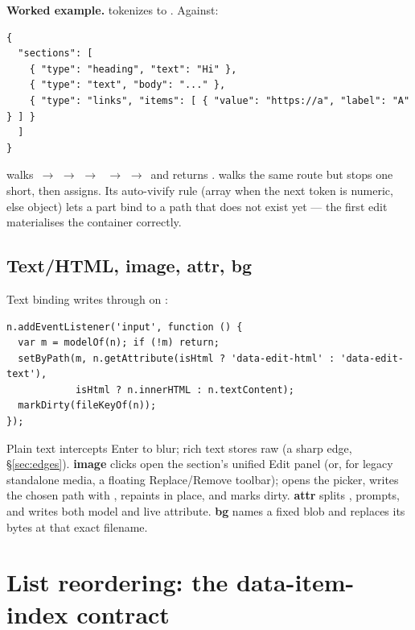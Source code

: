 \documentclass[11pt]{article}
\begin{document}
\textbf{Worked example.}  tokenizes to
. Against:

\begin{lstlisting}
{
  "sections": [
    { "type": "heading", "text": "Hi" },
    { "type": "text", "body": "..." },
    { "type": "links", "items": [ { "value": "https://a", "label": "A" } ] }
  ]
}
\end{lstlisting}

 walks \,$\to$\,\,$\to$\,\code{[2]}\,$\to$\,%
\,$\to$\,\code{[0]}\,$\to$\, and returns .
 walks the same route but stops one short, then assigns. Its
auto-vivify rule (array when the next token is numeric, else object) lets a part
bind to a path that does not exist yet --- the first edit materialises the
container correctly.

\subsection{Text/HTML, image, attr, bg}

Text binding writes through on :

\begin{lstlisting}
n.addEventListener('input', function () {
  var m = modelOf(n); if (!m) return;
  setByPath(m, n.getAttribute(isHtml ? 'data-edit-html' : 'data-edit-text'),
            isHtml ? n.innerHTML : n.textContent);
  markDirty(fileKeyOf(n));
});
\end{lstlisting}

Plain text intercepts Enter to blur; rich text stores raw  (a
sharp edge, \S\ref{sec:edges}). \textbf{image} clicks open the section's unified
Edit panel (or, for legacy standalone media, a floating Replace/Remove toolbar);
 opens the picker, writes the chosen path with ,
repaints in place, and marks dirty. \textbf{attr} splits , prompts,
and writes both model and live attribute. \textbf{bg} names a fixed blob and
replaces its bytes at that exact filename.

\section{List reordering: the data-item-index contract}\label{sec:list}
\end{document}
